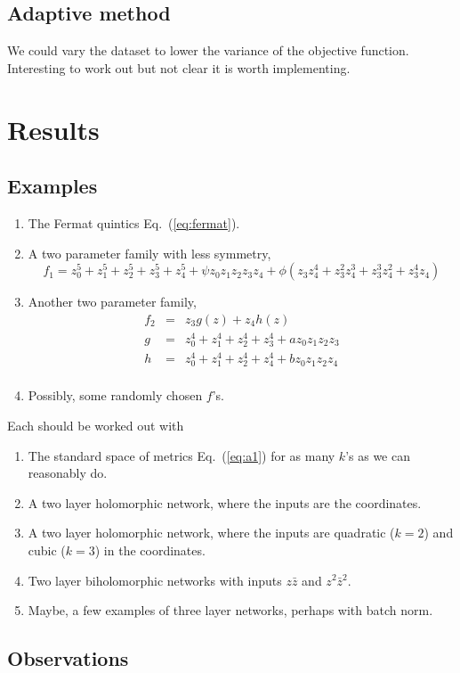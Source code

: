 \documentclass[12pt]{article}
\newcommand{\eq}[1]{Eq.~(\ref{eq:#1})}
\newcommand{\be}{\begin{equation}}
\newcommand{\ee}{\end{equation}}
\newcommand{\bea}{\begin{eqnarray}}
\newcommand{\eea}{\end{eqnarray}}
\def\bz{\bar{z}}
\def\bz{\bar{z}}
\begin{document}
\subsection{ Adaptive method }

We could vary the dataset to lower the variance of the objective function.  Interesting to work out
but not clear it is worth implementing.

\section{ Results }

\subsection{ Examples }

\begin{enumerate}
\item The Fermat quintics \eq{fermat}.
\item A two parameter family with less symmetry,
\be
f_1 = z_0^5 + z_1^5 + z_2^5 + z_3^5 + z_4^5 + \psi z_0z_1z_2z_3z_4 +\phi (z_3z_4^4 + z_3^2z_4^3 + z_3^3z_4^2 + z_3^4z_4)
\ee
\item Another two parameter family,
\bea
f_2 &=& z_3 g(z) + z_4 h(z) \\
g &=& z_0^4 + z_1^4 + z_2^4 + z_3^4 + a z_0z_1z_2z_3 \\
h &=& z_0^4 + z_1^4 + z_2^4 + z_4^4 + b z_0z_1z_2z_4 \\
\eea
\item Possibly, some randomly chosen $f$'s.
\end{enumerate}

Each should be worked out with
\begin{enumerate}
\item  The standard space of metrics \eq{a1} for as many $k$'s as we can reasonably do.
\item A two layer holomorphic network, where the inputs are the coordinates.
\item A two layer holomorphic network, where the inputs are quadratic ($k=2$) and cubic ($k=3$) in the coordinates.
\item Two layer biholomorphic networks with inputs $z\bz$ and $z^2\bz^2$.
\item Maybe, a few examples of three layer networks, perhaps with batch norm.
\end{enumerate}

\subsection{ Observations }
\end{document}
